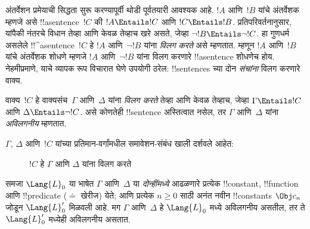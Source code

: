 \documentclass[../../../include/open-logic-section]{subfiles}
\begin{document}


अंतर्वेशन प्रमेयाची सिद्धता सुरू करण्यापूर्वी थोडी पूर्वतयारी आवश्यक आहे.
$!A$ आणि~$!B$ यांचे अंतर्वेशक म्हणजे असे !!a{sentence}~$!C$ की
$!A \Entails !C$ आणि $!C \Entails !B$. प्रतिपरिवर्तनानुसार, यांपैकी
नंतरचे विधान तेव्हा आणि केवळ तेव्हाच खरे असते, जेव्हा $\lnot !B
\Entails \lnot !C$. हा गुणधर्म असलेले !!^a{sentence}~$!C$ हे $!A$
आणि~$\lnot !B$ यांना \emph{विलग करते} असे म्हणतात. म्हणून $!A$ आणि~$!B$
यांचे अंतर्वेशक शोधणे म्हणजे $!A$ आणि~$\lnot !B$ यांना विलग करणारे
!!a{sentence} शोधणेच होय. नेहमीप्रमाणे, याचे व्यापक रूप विचारात घेणे उपयोगी
ठरेल: !!{sentence}s च्या दोन \emph{संचांना} विलग करणारे वाक्य.

\begin{defn}
वाक्य~$!C$ हे वाक्यसंच~$\Gamma$ आणि~$\Delta$ यांना \emph{विलग करते}
तेव्हा आणि केवळ तेव्हाच, जेव्हा $\Gamma \Entails !C$ आणि $\Delta
\Entails \lnot !C$. असे कोणतेही !!{sentence} अस्तित्वात नसेल, तर
$\Gamma$ आणि~$\Delta$ यांना \emph{अविलगनीय} म्हणतात.
\end{defn}

$\Gamma$, $\Delta$ आणि~$!C$ यांच्या प्रतिमान-वर्गांमधील समावेशन-संबंध
खाली दर्शवले आहेत:
\begin{figure}[h]
  \centering
  \caption{$!C$ हे $\Gamma$ आणि $\Delta$ यांना विलग करते}
\end{figure}


\begin{lem}
समजा $\Lang{L}_0$ या भाषेत $\Gamma$ आणि~$\Delta$ या \emph{दोन्हींमध्ये}
आढळणारे प्रत्येक !!{constant}, !!{function} आणि !!{predicate} ($\doteq$
खेरीज) येते; आणि प्रत्येक $n \ge 0$ साठी अनंत नवीन !!{constant}s
$\Obj c_n$ जोडून $\Lang{L}'_0$ मिळवली आहे. मग $\Gamma$ आणि~$\Delta$ हे
$\Lang{L}_0$ मध्ये अविलगनीय असतील, तर ते $\Lang{L}'_0$ मध्येही अविलगनीय
असतात.
\end{lem}
\end{document}
